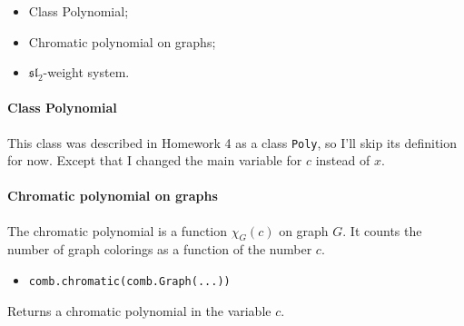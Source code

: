\documentclass[11pt]{article}
\providecommand{\tightlist}{%
      \setlength{\itemsep}{0pt}\setlength{\parskip}{0pt}}
\begin{document}
    \begin{itemize}
\tightlist
\item
  Class Polynomial;
\item
  Chromatic polynomial on graphs;
\item
  \(\mathfrak{sl}_2\)-weight system.
\end{itemize}

    \paragraph{Class Polynomial}\label{class-polynomial}

    This class was described in Homework 4 as a class \texttt{Poly}, so I'll
skip its definition for now. Except that I changed the main variable for
\(c\) instead of \(x\).

    \paragraph{Chromatic polynomial on
graphs}\label{chromatic-polynomial-on-graphs}

    The chromatic polynomial is a function \(\chi_G(c)\) on graph \(G\). It
counts the number of graph colorings as a function of the number \(c\).

    \begin{itemize}
\tightlist
\item
  \texttt{comb.chromatic(comb.Graph(...))}
\end{itemize}

    Returns a chromatic polynomial in the variable \(c\).
\end{document}
